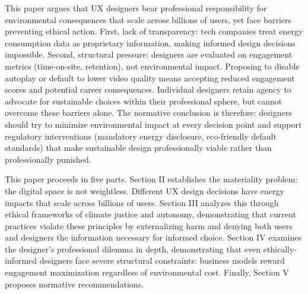 \par This paper argues that UX designers bear professional responsibility for
environmental consequences that scale across billions of users, yet face barriers preventing ethical action. First, lack of transparency: tech
companies treat energy consumption data as proprietary information, making
informed design decisions impossible. Second, structural pressure: designers are evaluated on
engagement metrics (time-on-site, retention), not environmental impact.
Proposing to disable autoplay or default to lower video quality means
accepting reduced engagement scores and potential career consequences. Individual designers retain
agency to advocate for sustainable choices within their professional sphere, but
cannot overcome these barriers alone. The normative conclusion is therefore:
designers should try to minimize environmental impact at every decision point and support
regulatory interventions (mandatory energy disclosure, eco-friendly default
standards) that make sustainable design professionally viable rather than
professionally punished.
\par This paper proceeds in five parts. Section II establishes the materiality
problem: the digital space is not weightless. Different UX design decisions have energy impacts that scale across billions of users.
Section III analyzes this through ethical frameworks of climate justice and autonomy, demonstrating that current practices violate
these principles by externalizing harm and denying both users and designers
the information necessary for informed choice. Section IV examines the
designer's professional dilemma in depth, demonstrating that even ethically-informed
designers face severe structural constraints: business models reward
engagement maximization regardless of environmental cost.
Finally, Section V proposes normative recommendations.
